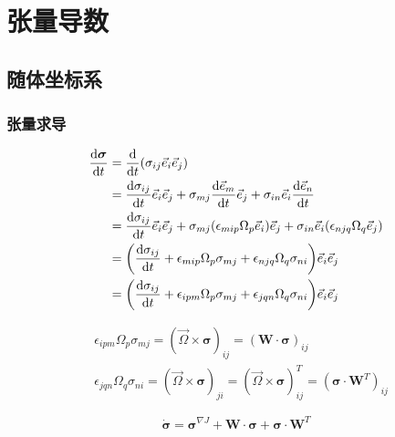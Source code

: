 \chapter{张量导数}

\section{随体坐标系}
\subsection{张量求导}
\begin{equation}
    \begin{split}
        \frac{\mathrm{d}\boldsymbol{\sigma}}{\mathrm{d}t}&=\frac{\mathrm{d}}{\mathrm{d}t}(\sigma_{ij}\vec{e}_i\vec{e}_j)\\
        &=\frac{\mathrm{d}\sigma_{ij}}{\mathrm{d}t}\vec{e}_i\vec{e}_j+\sigma_{mj}\frac{\mathrm{d}\vec{e}_m}{\mathrm{d}t}\vec{e}_j+\sigma_{in}\vec{e}_i\frac{\mathrm{d}\vec{e}_n}{\mathrm{d}t}\\
        &=\frac{\mathrm{d}\sigma_{ij}}{\mathrm{d}t}\vec{e}_i\vec{e}_j+\sigma_{mj}\qty(\epsilon_{mip}\Omega_p\vec{e}_i)\vec{e}_j+\sigma_{in}\vec{e}_i\qty(\epsilon_{njq}\Omega_q\vec{e}_j)\\
        &=\qty(\frac{\mathrm{d}\sigma_{ij}}{\mathrm{d}t}+\epsilon_{mip}\Omega_p\sigma_{mj}+\epsilon_{njq}\Omega_q\sigma_{ni})\vec{e}_i\vec{e}_j\\
        &=\qty(\frac{\mathrm{d}\sigma_{ij}}{\mathrm{d}t}+\epsilon_{ipm}\Omega_p\sigma_{mj}+\epsilon_{jqn}\Omega_q\sigma_{ni})\vec{e}_i\vec{e}_j
    \end{split}
\end{equation}

\begin{align}
    &\epsilon_{ipm}\Omega_p\sigma_{mj}=(\vec{\Omega}\times\boldsymbol{\sigma})_{ij}=(\textbf{W}\cdot\boldsymbol{\sigma})_{ij}\\
    &\epsilon_{jqn}\Omega_q\sigma_{ni}=(\vec{\Omega}\times\boldsymbol{\sigma})_{ji}=(\vec{\Omega}\times\boldsymbol{\sigma})^T_{ij}=(\boldsymbol{\sigma}\cdot\textbf{W}^T)_{ij}
\end{align}

\begin{equation}
    \dot{\boldsymbol{\sigma}}=\boldsymbol{\sigma}^{\nabla J}+\textbf{W}\cdot\boldsymbol{\sigma}+\boldsymbol{\sigma}\cdot\textbf{W}^{T}
\end{equation}
